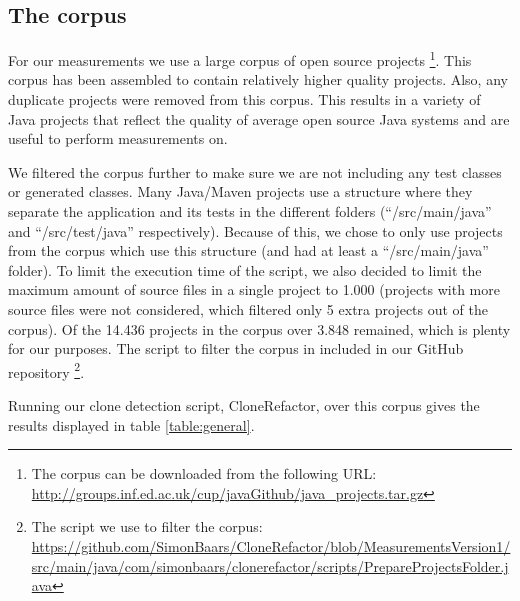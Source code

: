 \documentclass[a4paper]{article}
\begin{document}
\subsection{The corpus}\label{chap:corpus}
For our measurements we use a large corpus of open source projects \cite{githubCorpus2013}\footnote{The corpus can be downloaded from the following URL: \url{http://groups.inf.ed.ac.uk/cup/javaGithub/java_projects.tar.gz}}. This corpus has been assembled to contain relatively higher quality projects. Also, any duplicate projects were removed from this corpus. This results in a variety of Java projects that reflect the quality of average open source Java systems and are useful to perform measurements on.

We filtered the corpus further to make sure we are not including any test classes or generated classes. Many Java/Maven projects use a structure where they separate the application and its tests in the different folders (``/src/main/java'' and ``/src/test/java'' respectively). Because of this, we chose to only use projects from the corpus which use this structure (and had at least a ``/src/main/java'' folder). To limit the execution time of the script, we also decided to limit the maximum amount of source files in a single project to 1.000 (projects with more source files were not considered, which filtered only 5 extra projects out of the corpus). Of the 14.436 projects in the corpus over 3.848 remained, which is plenty for our purposes. The script to filter the corpus in included in our GitHub repository \footnote{The script we use to filter the corpus: \url{https://github.com/SimonBaars/CloneRefactor/blob/MeasurementsVersion1/src/main/java/com/simonbaars/clonerefactor/scripts/PrepareProjectsFolder.java}}.

Running our clone detection script, CloneRefactor, over this corpus gives the results displayed in table \ref{table:general}.
\end{document}
